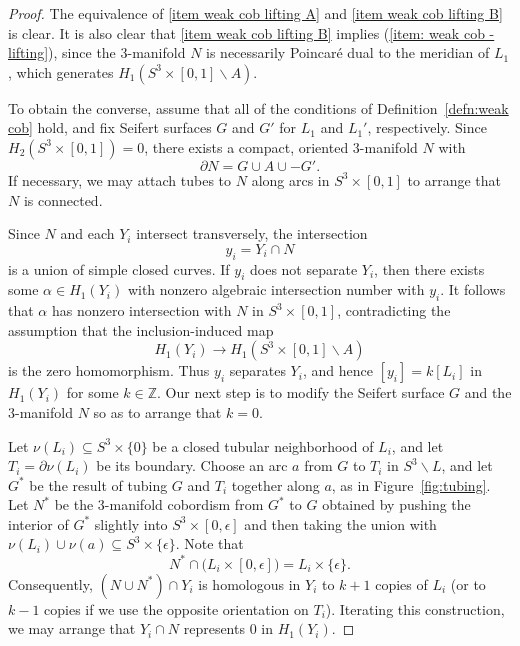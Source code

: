 \documentclass[a4paper, 11pt]{amsart}
\theoremstyle{definition}
\newcommand{\bdry}{\partial}
\newcommand{\Z}{\mathbb{Z}}
\newcommand{\pref}[1]{(\ref{#1})}
\begin{document}
\begin{proof}

The equivalence of \ref{item weak cob lifting A} and \ref{item weak cob lifting B} is clear. It is also clear that \ref{item weak cob lifting B} implies \pref{item: weak cob - lifting}, since the $3$-manifold $N$ is necessarily Poincar\'e dual to the meridian of $L_1$, which generates $H_1(S^3\times[0,1]\smallsetminus A)$.


To obtain the converse, assume that all of the conditions of Definition~\ref{defn:weak cob} hold, and fix Seifert surfaces $G$ and $G'$ for $L_1$ and $L_1'$, respectively. Since $H_2(S^3\times[0,1])=0$, there exists a compact, oriented $3$-manifold $N$ with
\[
\partial N = G\cup A\cup -G'.
\]
If necessary, we may attach tubes to $N$ along arcs in $S^3\times[0,1]$ to arrange that $N$ is connected.

Since $N$ and each $Y_i$ intersect transversely, the intersection
\[
y_i = Y_i\cap N
\]
is a union of simple closed curves. If $y_i$ does not separate $Y_i$, then there exists some $\alpha\in H_1(Y_i)$ with nonzero algebraic intersection number with $y_i$. It follows that $\alpha$ has nonzero intersection with $N$ in $S^3\times[0,1]$, contradicting the assumption that the inclusion-induced map
\[
H_1(Y_i)\to H_1(S^3\times[0,1]\smallsetminus A)
\]
is the zero homomorphism. Thus $y_i$ separates $Y_i$, and hence $[y_i]=k[L_i]$ in $H_1(Y_i)$ for some $k\in \Z$. Our next step is to modify the Seifert surface $G$ and the $3$-manifold $N$ so as to arrange that $k=0$.

Let $\nu(L_i)\subseteq S^3\times \{0\}$ be a closed tubular neighborhood of $L_i$, and let $T_i=\bdry \nu(L_i)$ be its boundary. Choose an arc $a$ from $G$ to $T_i$ in $S^3\smallsetminus L$, and let $G^*$ be the result of tubing $G$ and $T_i$ together along $a$, as in Figure~\ref{fig:tubing}. Let $N^*$ be the $3$-manifold cobordism from $G^*$ to $G$ obtained by pushing the interior of $G^*$ slightly into $S^3\times[0,\epsilon]$ and then taking the union with $\nu(L_i)\cup \nu(a)\subseteq S^3\times\{\epsilon\}$. Note that
\[
N^*\cap \bigl(L_i\times[0,\epsilon]\bigr) = L_i\times\{\epsilon\}.
\]
Consequently, $(N\cup N^*)\cap Y_i$ is homologous in $Y_i$ to $k+1$ copies of $L_i$ (or to $k-1$ copies if we use the opposite orientation on $T_i$). Iterating this construction, we may arrange that $Y_i\cap N$ represents $0$ in $H_1(Y_i)$.



\end{proof}
\end{document}
